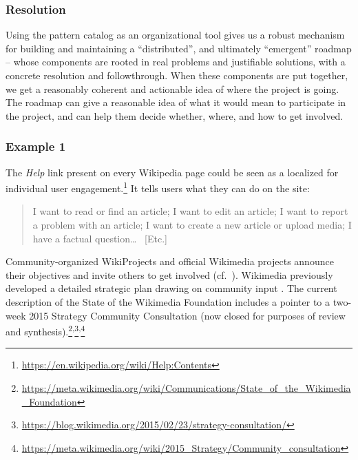 \subsubsection*{Resolution}
Using the pattern catalog as an
organizational tool gives us a robust mechanism for
building and maintaining a ``distributed'', and ultimately
``emergent'' roadmap -- whose components are rooted in real problems
and justifiable solutions, with a concrete resolution and
followthrough.  When these components are put together, we get a
reasonably coherent and actionable idea of where the project is going.
%
The roadmap can give  a reasonable idea of what it would mean to participate in the project, and can help them  decide whether, where, and how to get involved.

\subsubsection*{Example 1}  The \emph{Help} link present on every Wikipedia page could be seen as a
localized  for individual user
engagement.\footnote{\url{https://en.wikipedia.org/wiki/Help:Contents}}
It tells users what they can do on the site:

\begin{quotation}
\noindent 
I want to read or find an article;
I want to edit an article;
I want to report a problem with an article;
I want to create a new article or upload media;
I have a factual question\ldots
~[Etc.]
\end{quotation}

Community-organized WikiProjects and official Wikimedia projects announce their objectives  and invite others to get involved (cf.~).  Wikimedia previously developed
a detailed strategic plan drawing on community input
\cite{wikimedia2011plan}.  The current description of the State of
the Wikimedia Foundation includes a pointer to a two-week 2015
Strategy Community Consultation (now closed for purposes of
review and synthesis).\footnote{\url{https://meta.wikimedia.org/wiki/Communications/State_of_the_Wikimedia_Foundation}}\textsuperscript{,}\footnote{\url{https://blog.wikimedia.org/2015/02/23/strategy-consultation/}}\textsuperscript{,}\footnote{\url{https://meta.wikimedia.org/wiki/2015_Strategy/Community_consultation}}

